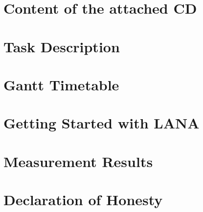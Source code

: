 \chapter{\label{chp:content} Content of the attached CD}
\chapter{\label{chp:content} Task Description}
\chapter{\label{chp:content} Gantt Timetable}
\chapter{\label{chp:content} Getting Started with LANA}
\chapter{\label{chp:content} Measurement Results}
\chapter{\label{chp:content} Declaration of Honesty}

